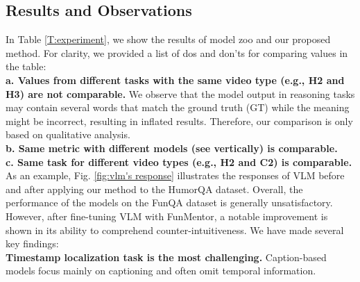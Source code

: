 \subsection{Results and Observations}

In Table \ref{T:experiment}, we show the results of model zoo and
our proposed method. For clarity, we provided a list of dos and don’ts for comparing values in the table:\\ 
\textbf{a. Values from different tasks with the same video type (e.g., H2 and H3) are not comparable.} We observe that the model output in reasoning tasks may contain several words that match the ground truth (GT) while the meaning might be incorrect, resulting in inflated results. Therefore, our comparison is only based on qualitative analysis. \\
\textbf{b. Same metric with different models (see vertically) is comparable.}\\
\textbf{c. Same task for different video types (e.g., H2 and C2) is comparable.}\\
As an example, Fig. \ref{fig:vlm's response} illustrates the responses of VLM before and after applying our method to the HumorQA dataset. Overall, the performance of the models on the FunQA dataset is generally unsatisfactory. However, after fine-tuning VLM with FunMentor, a notable improvement is shown in its ability to comprehend counter-intuitiveness. We have made several key findings:\\
\noindent\textbf{Timestamp localization task is the most challenging.}\quad
Caption-based models focus mainly on captioning and often omit temporal information. 
\begin{table}
\centering
\vspace{-1cm}
\small
\caption{\textbf{Timestamp Localization Task's baseline.} The result uses IOU metrics.}
\label{tab:iou}
\caption{\textbf{Human Performance on HumorQA.} The average scores using BLEURT / GPT-4. Full results are in Appendix \ref{appendix_d: Experiments}.}
\vspace{-1cm}
\label{tab:human}
\end{table}
